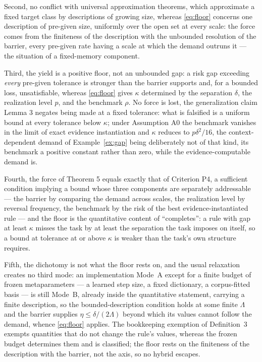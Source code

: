 Second, no conflict with universal approximation theorems, which approximate a fixed target class by descriptions of growing size, whereas \eqref{eq:floor} concerns one description of pre-given size, uniformly over the open set at every scale: the force comes from the finiteness of the description with the unbounded resolution of the barrier, every pre-given rate having a scale at which the demand outruns it --- the situation of a fixed-memory component.

Third, the yield is a positive floor, not an unbounded gap: a risk gap exceeding \emph{every} pre-given tolerance is stronger than the barrier supports and, for a bounded loss, unsatisfiable, whereas \eqref{eq:floor} gives $\kappa$ determined by the separation $\delta$, the realization level $p$, and the benchmark $\rho$. No force is lost, the generalization claim Lemma 3 negates being made at a fixed tolerance: what is falsified is a uniform bound at every tolerance below $\kappa$; under Assumption A0 the benchmark vanishes in the limit of exact evidence instantiation and $\kappa$ reduces to $p \delta^2 / 16$, the context-dependent demand of Example~\ref{ex:gap} being deliberately not of that kind, its benchmark a positive constant rather than zero, while the evidence-computable demand is.

Fourth, the force of Theorem 5 equals exactly that of Criterion P4, a sufficient condition implying a bound whose three components are separately addressable --- the barrier by comparing the demand across scales, the realization level by reversal frequency, the benchmark by the risk of the best evidence-instantiated rule --- and the floor is the quantitative content of ``completes'': a rule with gap at least $\kappa$ misses the task by at least the separation the task imposes on itself, so a bound at tolerance at or above $\kappa$ is weaker than the task's own structure requires.

Fifth, the dichotomy is not what the floor rests on, and the usual relaxation creates no third mode: an implementation Mode~A except for a finite budget of frozen metaparameters --- a learned step size, a fixed dictionary, a corpus-fitted basis --- is still Mode~B, already inside the quantitative statement, carrying a finite description, so the bounded-description condition holds at some finite $\Lambda$ and the barrier supplies $\eta \le \delta / (2\Lambda)$ beyond which its values cannot follow the demand, whence \eqref{eq:floor} applies. The bookkeeping exemption of Definition~3 exempts quantities that do not change the rule's values, whereas the frozen budget determines them and is classified; the floor rests on the finiteness of the description with the barrier, not the axis, so no hybrid escapes.

